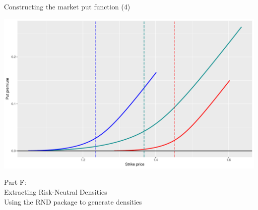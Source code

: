 \begin{frame}{Constructing the market put function (4)}

\includegraphics[width=0.9\linewidth]{2018_02_07_IMF_FXCourse_files/figure-beamer/unnamed-chunk-48-1}

\end{frame}

\begin{frame}{}

\color{blue} \LARGE{Part F:}\\
\LARGE{Extracting Risk-Neutral Densities}\\
\Large{Using the RND package to generate densities}

\end{frame}
